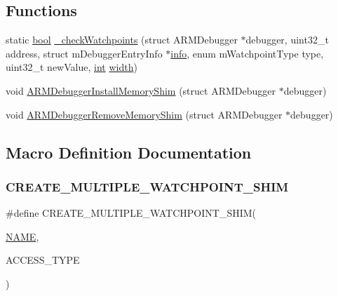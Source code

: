 \subsection*{Functions}
\begin{DoxyCompactItemize}
\item 
static \mbox{\hyperlink{libretro_8h_a4a26dcae73fb7e1528214a068aca317e}{bool}} \mbox{\hyperlink{arm_2debugger_2memory-debugger_8c_af27e1b9541b0d441825fffdc4d3ad7fb}{\+\_\+check\+Watchpoints}} (struct A\+R\+M\+Debugger $\ast$debugger, uint32\+\_\+t address, struct m\+Debugger\+Entry\+Info $\ast$\mbox{\hyperlink{libretro_8h_a283ad41e4809f9c0ebe736a9861d8a91}{info}}, enum m\+Watchpoint\+Type type, uint32\+\_\+t new\+Value, \mbox{\hyperlink{ioapi_8h_a787fa3cf048117ba7123753c1e74fcd6}{int}} \mbox{\hyperlink{readppm_8c_a59b7c57bf1dc7c36ac7c8232cf5bb713}{width}})
\item 
void \mbox{\hyperlink{arm_2debugger_2memory-debugger_8c_aca7f028f215a0ba438cbbeb1078619cc}{A\+R\+M\+Debugger\+Install\+Memory\+Shim}} (struct A\+R\+M\+Debugger $\ast$debugger)
\item 
void \mbox{\hyperlink{arm_2debugger_2memory-debugger_8c_a992becb15eac2fbba9cae6d17ae396ff}{A\+R\+M\+Debugger\+Remove\+Memory\+Shim}} (struct A\+R\+M\+Debugger $\ast$debugger)
\end{DoxyCompactItemize}


\subsection{Macro Definition Documentation}
\mbox{\label{arm_2debugger_2memory-debugger_8c_a008fc423e33f25eeda54fcfcbd2036c4}} 
\subsubsection{\texorpdfstring{C\+R\+E\+A\+T\+E\+\_\+\+M\+U\+L\+T\+I\+P\+L\+E\+\_\+\+W\+A\+T\+C\+H\+P\+O\+I\+N\+T\+\_\+\+S\+H\+IM}{CREATE\_MULTIPLE\_WATCHPOINT\_SHIM}}
{\footnotesize\ttfamily \#define C\+R\+E\+A\+T\+E\+\_\+\+M\+U\+L\+T\+I\+P\+L\+E\+\_\+\+W\+A\+T\+C\+H\+P\+O\+I\+N\+T\+\_\+\+S\+H\+IM(\begin{DoxyParamCaption}\item[{}]{\mbox{\hyperlink{inflate_8h_a164ea0159d5f0b5f12a646f25f99eceaa67bc2ced260a8e43805d2480a785d312}{N\+A\+ME}},  }\item[{}]{A\+C\+C\+E\+S\+S\+\_\+\+T\+Y\+PE }\end{DoxyParamCaption})}


